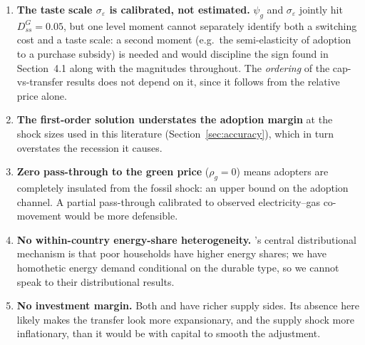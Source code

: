 \documentclass[11pt,a4paper]{article}
\begin{document}
\begin{enumerate}\itemsep3pt

\item \textbf{The taste scale $\sigma_{\varepsilon}$ is calibrated, not
estimated.} $\psi_g$ and $\sigma_\varepsilon$ jointly hit $D^G_{ss}=0.05$, but
one level moment cannot separately identify both a switching cost and a taste
scale: a second moment (e.g.\ the semi-elasticity of adoption to a purchase
subsidy) is needed and would discipline the sign found in
Section~4.1 along with the magnitudes throughout. The \emph{ordering} of the
cap-vs-transfer results does not depend on it, since it follows from the
relative price alone.

\item \textbf{The first-order solution understates the adoption margin} at
the shock sizes used in this literature (Section~\ref{sec:accuracy}), which
in turn overstates the recession it causes.

\item \textbf{Zero pass-through to the green price} ($\rho_g=0$) means
adopters are completely insulated from the fossil shock: an upper bound on
the adoption channel. A partial pass-through calibrated to observed
electricity--gas co-movement would be more defensible.

\item \textbf{No within-country energy-share heterogeneity.}
\citet{Bayer2026}'s central distributional mechanism is that poor households
have higher energy shares; we have homothetic energy demand conditional on
the durable type, so we cannot speak to their distributional results.

\item \textbf{No investment margin.} Both \citet{Bayer2026} and
\citet{ARS2024} have richer supply sides. Its absence here likely makes the
transfer look more expansionary, and the supply shock more inflationary, than
it would be with capital to smooth the adjustment.

\end{enumerate}
\end{document}
